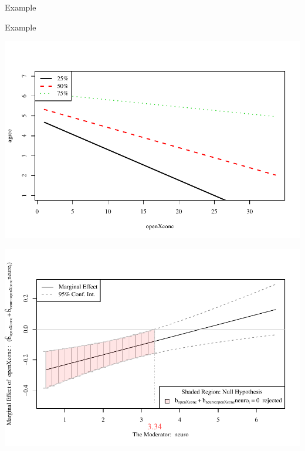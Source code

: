 \documentclass{beamer}
\begin{document}
\begin{frame}[allowframebreaks]{Example}
    


\pagebreak



\pagebreak



\pagebreak



\pagebreak



\pagebreak



\pagebreak



\end{frame}



\begin{frame}[allowframebreaks]{Example}
  

\includegraphics{sweaveFiles/-017}

\pagebreak


\includegraphics{sweaveFiles/-018}

\end{frame}
\end{document}
